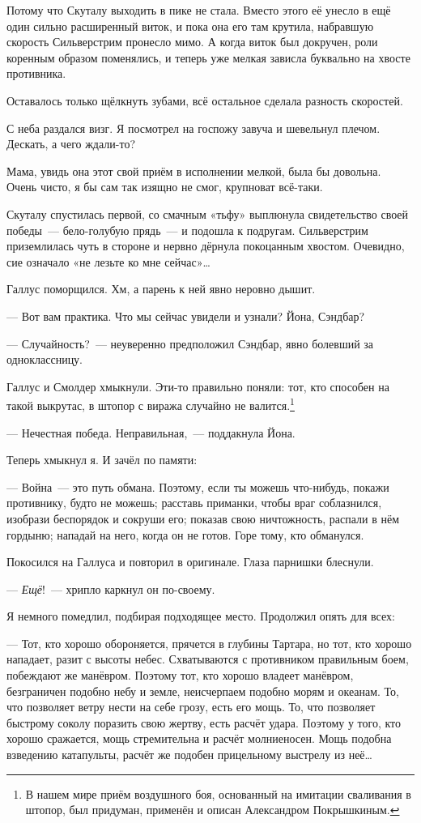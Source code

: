 \documentclass[fontsize=11pt,a5paper,titlepage=firstcover]{scrbook}
\begin{document}
Потому что Скуталу выходить в пике не стала. Вместо этого её унесло в ещё один сильно расширенный виток, и пока она его там крутила, набравшую скорость Сильверстрим пронесло мимо. А когда виток был докручен, роли коренным образом поменялись, и теперь уже мелкая зависла буквально на хвосте противника.

Оставалось только щёлкнуть зубами, всё остальное сделала разность скоростей.

С неба раздался визг. Я посмотрел на госпожу завуча и шевельнул плечом. Дескать, а чего ждали-то?

Мама, увидь она этот свой приём в исполнении мелкой, была бы довольна. Очень чисто, я бы сам так изящно не смог, крупноват всё-таки.

Скуталу спустилась первой, со смачным «тьфу» выплюнула свидетельство своей победы~--- бело-голубую прядь~--- и подошла к подругам. Сильверстрим приземлилась чуть в стороне и нервно дёрнула покоцанным хвостом. Очевидно, сие означало «не лезьте ко мне сейчас»{\ldots}

Галлус поморщился. Хм, а парень к ней явно неровно дышит.

--- Вот вам практика. Что мы сейчас увидели и узнали? Йона, Сэндбар?

--- Случайность?~--- неуверенно предположил Сэндбар, явно болевший за одноклассницу.

Галлус и Смолдер хмыкнули. Эти-то правильно поняли: тот, кто способен на такой выкрутас, в штопор с виража случайно не валится.\footnote{В нашем мире приём воздушного боя, основанный на имитации сваливания в штопор, был придуман, применён и описан Александром Покрышкиным.}

--- Нечестная победа. Неправильная,~--- поддакнула Йона.

Теперь хмыкнул я. И зачёл по памяти:

--- Война~--- это путь обмана. Поэтому, если ты можешь что-нибудь, покажи противнику, будто не можешь; расставь приманки, чтобы враг соблазнился, изобрази беспорядок и сокруши его; показав свою ничтожность, распали в нём гордыню; нападай на него, когда он не готов. Горе тому, кто обманулся.

Покосился на Галлуса и повторил в оригинале. Глаза парнишки блеснули.

--- \emph{Ещё}!~--- хрипло каркнул он по-своему.

Я немного помедлил, подбирая подходящее место. Продолжил опять для всех:

--- Тот, кто хорошо обороняется, прячется в глубины Тартара, но тот, кто хорошо нападает, разит с высоты небес. Схватываются с противником правильным боем, побеждают же манёвром. Поэтому тот, кто хорошо владеет манёвром, безграничен подобно небу и земле, неисчерпаем подобно морям и океанам. То, что позволяет ветру нести на себе грозу, есть его мощь. То, что позволяет быстрому соколу поразить свою жертву, есть расчёт удара. Поэтому у того, кто хорошо сражается, мощь стремительна и расчёт молниеносен. Мощь подобна взведению катапульты, расчёт же подобен прицельному выстрелу из неё{\ldots}
\end{document}
